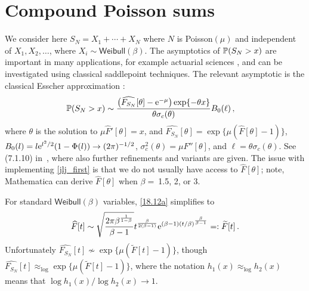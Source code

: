 \section{Compound Poisson sums}\label{S:CompP}
 We  consider here $S_N=X_1+\cdots+X_N$ where
$N$ is Poisson$(\mu)$ and independent of $X_1,X_2,\ldots$, where $X_i \sim \mathsf{Weibull}(\beta)$. The asymptotics of
$\mathbb{P}(S_N>x)$ are important in many applications, for example actuarial sciences \cite{asmussen2010ruin}, and can be investigated using classical saddlepoint techniques. The relevant asymptotic is the classical Esscher approximation :
\begin{align}
	\mathbb{P}(S_N > x) 
	&\sim \frac{
		\big( \widehat{F_{S_N}}[\theta] - \mathrm{e}^{-\mu} \big) \exp \{ -\theta x \}
	}{
		\theta \sigma_c(\theta)
	} B_0(\ell)  \label{jlj_first}  \,,
\end{align}
where $\theta$ is the solution to $\mu \widehat{F}'[\theta] = x$, and $\widehat{F_{S_N}}[\theta] = \exp \{ \mu (\widehat{F}[\theta] - 1 ) \}$, 
$B_0(l) = l \mathrm{e}^{l^2/2}(1 - \Phi(l)) \to (2\pi)^{-1/2}$, $\sigma_c^2(\theta)= \mu F''[\theta]$, and $\ell = \theta \sigma_c(\theta)$. See (7.1.10) in~\cite{JLJ},
where also further
refinements and variants are given. The issue with implementing \eqref{jlj_first} is that we do not usually have access to $\widehat{F}[\theta]$; note, Mathematica can derive $\widehat{F}[\theta]$ when $\beta =\ $1.5, 2, or 3.

For standard $\mathsf{Weibull}(\beta)$ variables, \eqref{18.12a} simplifies to%
\begin{align*} 
\widehat{F}[t] \sim \sqrt{\frac{2 \pi \beta ^{\frac{1}{1-\beta }}}{\beta -1}}  t^{\frac{\beta}{2(\beta-1)}} \mathrm{e}^{(\beta -1) (t/\beta)^{\frac{\beta }{\beta -1}}} =: \widetilde{F}[t]\,.
\end{align*}
Unfortunately $\widehat{F_{S_N}}[t] \not\sim \exp\{\mu( \widetilde{F}[t] - 1)\}$, though $\widehat{F_{S_N}}[t] \approx_{\log} \exp\{\mu( \widetilde{F}[t] - 1)\}$, where the notation $h_1(x)\approx_{\log}h_2(x)$ means that $\log h_1(x)/\log h_2(x)\to 1$.

